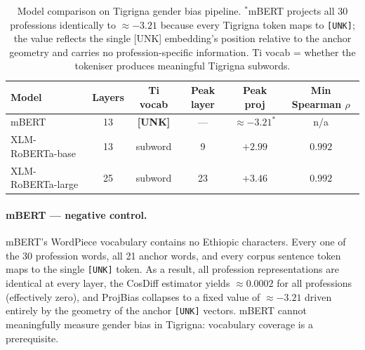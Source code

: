 \documentclass[11pt,a4paper]{article}
\begin{document}
\begin{table}[h]
\centering
\small
\begin{tabular}{lccccc}
\toprule
\textbf{Model} & \textbf{Layers} & \textbf{Ti vocab} & \textbf{Peak layer} & \textbf{Peak proj} & \textbf{Min Spearman $\rho$} \\
\midrule
mBERT                & 13 & \textbf{[UNK]} & --- & $\approx -3.21^*$ & n/a \\
XLM-RoBERTa-base     & 13 & subword        & 9   & $+2.99$            & $0.992$ \\
XLM-RoBERTa-large    & 25 & subword        & 23  & $+3.46$            & $0.992$ \\
\bottomrule
\end{tabular}
\caption{Model comparison on Tigrigna gender bias pipeline. $^*$mBERT projects
all 30 professions identically to $\approx -3.21$ because every Tigrigna token
maps to \texttt{[UNK]}; the value reflects the single [UNK] embedding's position
relative to the anchor geometry and carries no profession-specific information.
Ti vocab = whether the tokeniser produces meaningful Tigrigna subwords.}
\label{tab:model_compare}
\end{table}

\paragraph{mBERT — negative control.}
mBERT's WordPiece vocabulary contains no Ethiopic characters. Every one of the
30 profession words, all 21 anchor words, and every corpus sentence token maps
to the single \texttt{[UNK]} token. As a result, all profession representations
are identical at every layer, the CosDiff estimator yields $\approx 0.0002$ for
all professions (effectively zero), and ProjBias collapses to a fixed value of
$\approx -3.21$ driven entirely by the geometry of the anchor
\texttt{[UNK]} vectors. mBERT cannot meaningfully measure gender bias in
Tigrigna: vocabulary coverage is a prerequisite.
\end{document}
